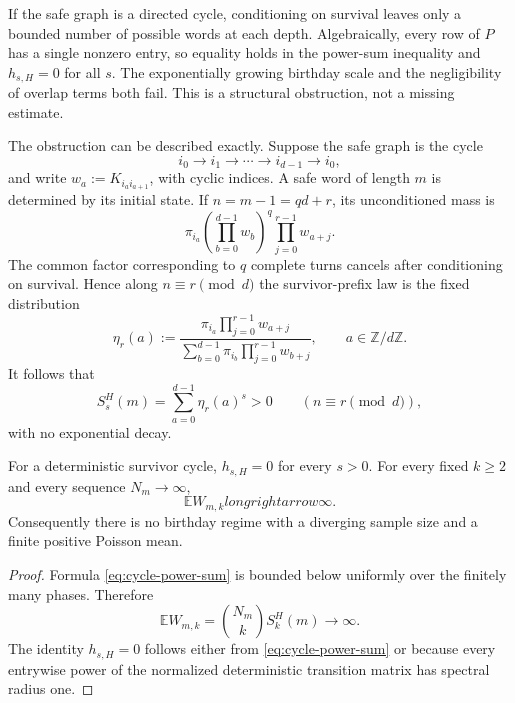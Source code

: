 \begin{remark}
\label{rem:deterministic-obstruction}
If the safe graph is a directed cycle, conditioning on survival leaves
only a bounded number of possible words at each depth.  Algebraically,
every row of \(P\) has a single nonzero entry, so equality holds in the
power-sum inequality and \(h_{s,H}=0\) for all \(s\).  The exponentially
growing birthday scale and the negligibility of overlap terms both
fail.  This is a structural obstruction, not a missing estimate.
\end{remark}

The obstruction can be described exactly.  Suppose the safe graph is
the cycle
\[
  i_0\longrightarrow i_1\longrightarrow\cdots
  \longrightarrow i_{d-1}\longrightarrow i_0,
\]
and write \(w_a:=K_{i_a i_{a+1}}\), with cyclic indices.  A safe word of
length \(m\) is determined by its initial state.  If \(n=m-1=qd+r\),
its unconditioned mass is
\[
  \pi_{i_a}
  \left(\prod_{b=0}^{d-1}w_b\right)^q
  \prod_{j=0}^{r-1}w_{a+j}.
\]
The common factor corresponding to \(q\) complete turns cancels after
conditioning on survival.  Hence along \(n\equiv r\pmod d\) the
survivor-prefix law is the fixed distribution
\begin{equation}
  \eta_r(a)
  :=\frac{\displaystyle
       \pi_{i_a}\prod_{j=0}^{r-1}w_{a+j}}
      {\displaystyle
       \sum_{b=0}^{d-1}\pi_{i_b}\prod_{j=0}^{r-1}w_{b+j}},
  \qquad a\in\mathbb Z/d\mathbb Z.
  \label{eq:cycle-conditioned-law}
\end{equation}
It follows that
\begin{equation}
  S_s^H(m)=\sum_{a=0}^{d-1}\eta_r(a)^s>0
  \qquad(n\equiv r\pmod d),
  \label{eq:cycle-power-sum}
\end{equation}
with no exponential decay.

\begin{proposition}
\label{prop:cycle-failure}
For a deterministic survivor cycle, \(h_{s,H}=0\) for every \(s>0\).
For every fixed \(k\geq2\) and every sequence \(N_m\to\infty\),
\[
  \mathbb EW_{m,k}longrightarrow\infty.
\]
Consequently there is no birthday regime with a diverging sample size
and a finite positive Poisson mean.
\end{proposition}

\begin{proof}
Formula \eqref{eq:cycle-power-sum} is bounded below uniformly over the
finitely many phases.  Therefore
\[
  \mathbb EW_{m,k}
  =\binom{N_m}{k}S_k^H(m)\longrightarrow\infty.
\]
The identity \(h_{s,H}=0\) follows either from
\eqref{eq:cycle-power-sum} or because every entrywise power of the
normalized deterministic transition matrix has spectral radius one.
\end{proof}


